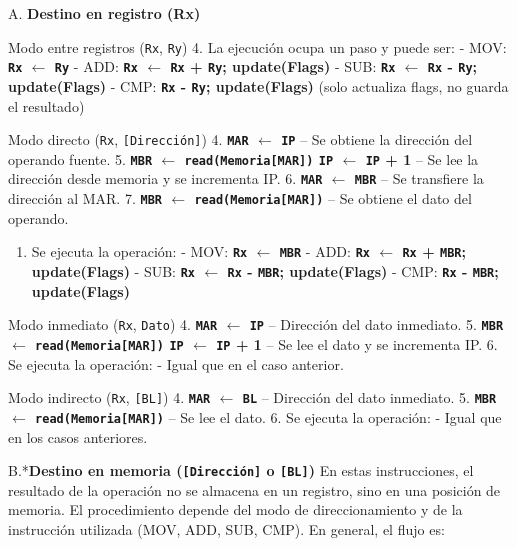 \documentclass[12pt,oneside]{templates/unerthesis}
\providecommand{\tightlist}{%
  \setlength{\itemsep}{0pt}\setlength{\parskip}{0pt}}
\begin{document}
A. \textbf{Destino en registro (Rx)}

Modo entre registros (\texttt{Rx}, \texttt{Ry})
4. La ejecución ocupa un paso y puede ser:
- MOV: \textbf{\texttt{Rx} \(\leftarrow\) \texttt{Ry}}
- ADD: \textbf{\texttt{Rx} \(\leftarrow\) \texttt{Rx} + \texttt{Ry}; update(Flags)}
- SUB: \textbf{\texttt{Rx} \(\leftarrow\) \texttt{Rx} - \texttt{Ry}; update(Flags)}
- CMP: \textbf{\texttt{Rx} - \texttt{Ry}; update(Flags)} (solo actualiza flags, no guarda el resultado)

Modo directo (\texttt{Rx}, \texttt{{[}Dirección{]}})
4. \textbf{\texttt{MAR} \(\leftarrow\) \texttt{IP}} -- Se obtiene la dirección del operando fuente.
5. \textbf{\texttt{MBR} \(\leftarrow\) \texttt{read(Memoria{[}MAR{]})} \textbar{} \texttt{IP} \(\leftarrow\) \texttt{IP} + 1} -- Se lee la dirección desde memoria y se incrementa IP.
6. \textbf{\texttt{MAR} \(\leftarrow\) \texttt{MBR}} -- Se transfiere la dirección al MAR.
7. \textbf{\texttt{MBR} \(\leftarrow\) \texttt{read(Memoria{[}MAR{]})}} -- Se obtiene el dato del operando.

\begin{enumerate}
\def\labelenumi{\arabic{enumi}.}
\setcounter{enumi}{7}
\tightlist
\item
  Se ejecuta la operación:
  - MOV: \textbf{\texttt{Rx} \(\leftarrow\) \texttt{MBR}}
  - ADD: \textbf{\texttt{Rx} \(\leftarrow\) \texttt{Rx} + \texttt{MBR}; update(Flags)}
  - SUB: \textbf{\texttt{Rx} \(\leftarrow\) \texttt{Rx} - \texttt{MBR}; update(Flags)}
  - CMP: \textbf{\texttt{Rx} - \texttt{MBR}; update(Flags)}
\end{enumerate}

Modo inmediato (\texttt{Rx}, \texttt{Dato})
4. \textbf{\texttt{MAR} \(\leftarrow\) \texttt{IP}} -- Dirección del dato inmediato.
5. \textbf{\texttt{MBR} \(\leftarrow\) \texttt{read(Memoria{[}MAR{]})} \textbar{} \texttt{IP} \(\leftarrow\) \texttt{IP} + 1} -- Se lee el dato y se incrementa IP.
6. Se ejecuta la operación:
- Igual que en el caso anterior.

Modo indirecto (\texttt{Rx}, \texttt{{[}BL{]}})
4. \textbf{\texttt{MAR} \(\leftarrow\) \texttt{BL}} -- Dirección del dato inmediato.
5. \textbf{\texttt{MBR} \(\leftarrow\) \texttt{read(Memoria{[}MAR{]})}} -- Se lee el dato.
6. Se ejecuta la operación:
- Igual que en los casos anteriores.

B.*\textbf{Destino en memoria (\texttt{{[}Dirección{]}} o \texttt{{[}BL{]}})}
En estas instrucciones, el resultado de la operación no se almacena en un registro, sino en una posición de memoria.
El procedimiento depende del modo de direccionamiento y de la instrucción utilizada (MOV, ADD, SUB, CMP).
En general, el flujo es:
\end{document}
